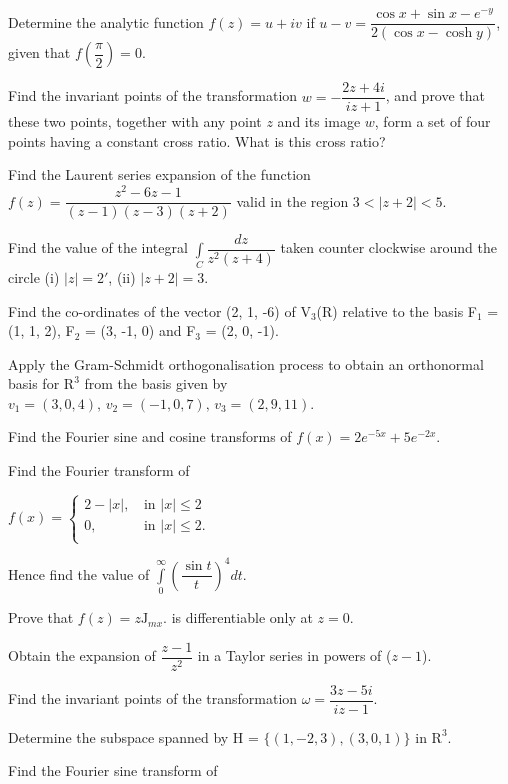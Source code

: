 \markB
\partC

\item \iitem Determine the analytic function $f(z) = u + iv$ if $ u - v = \dfrac{\cos x + \sin x - e^{-y}}{
  2(\cos x - \cosh y)}$, given that $f \left(\dfrac{\pi}{2}\right)=0$.
\Or
\item Find the invariant points of the transformation $w = - \dfrac{2z + 4i}{iz + 1}$, and prove that these 
  two points, together with any point $z$ and its image $w$, form a set of four points having a constant cross
  ratio. What is this cross ratio?
\ene

\item \iitem Find the Laurent series expansion of the function $f(z) = \dfrac{z^2 - 6z - 1}{(z - 1)(z - 3)(z + 2)}$
  valid in the region $3 < |z + 2| < 5.$
\Or
\item Find the value of the integral $\int\limits_{C} \dfrac{dz}{z^2 (z + 4)}$ taken counter clockwise around
  the circle (i) $|z| = 2'$, (ii) $|z + 2| = 3$.
\ene

\item \iitem Find the co-ordinates of the vector (2, 1, -6) of V$_3$(R) relative to the basis F$_1$ = (1, 1, 2),
  F$_2$ = (3, -1, 0) and F$_3$ = (2, 0, -1).
\again
\Or
\item Apply the Gram-Schmidt orthogonalisation process to obtain an orthonormal basis for $\mathrm{R}^3$ from the basis given by
  $v_1 = (3, 0, 4),\, v_2 = (-1, 0, 7),\, v_3 = (2, 9, 11)$.
\ene

\item \iitem Find the Fourier sine and cosine transforms of $f(x) = 2 e^{-5x} + 5 e^{-2x}$.
\Or
\item Find the Fourier transform of

$f(x) = 
  \begin{cases}
    2 - |x|,& \, \text{in } |x| \leq  2\\
    0, & \, \text{in } |x| \leq 2.\\
  \end{cases}$

Hence find the value of $\int\limits_0^\infty \left( \dfrac{\sin t}{t}\right)^4 dt$.
\ene

\markC
\ene

\newpage

\sub{\subj}
\maxtime

\partA

\iitem Prove that $f(z) = z \text{J}_{mx}$. is differentiable only at $z = 0$.
\item Obtain the expansion of $\dfrac{z-1}{z^2}$ in a Taylor series in powers of ($z - 1$).
\item Find the invariant points of the transformation $\omega = \dfrac{3z - 5i}{iz - 1}$.
\item Determine the subspace spanned by H = $\{(1, -2, 3), (3, 0, 1)\}$ in $\mathrm{R}^3$.
\item Find the Fourier sine transform of 

